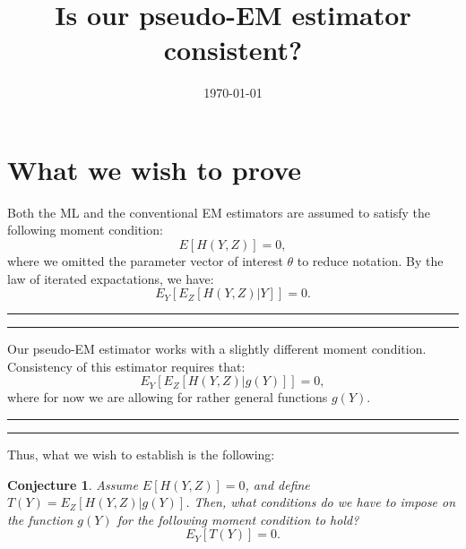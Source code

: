 \documentclass[12pt, a4paper]{article}
\title{Is our pseudo-EM estimator consistent?}
\date{\today}
\newtheorem{conjecture}[theorem]{Conjecture}
\begin{document}
\maketitle


\section{What we wish to prove}
Both the ML and the conventional EM estimators are assumed to satisfy the following moment condition:
\begin{equation}
E[H(Y,Z)]=0,
\end{equation}
where we omitted the parameter vector of interest $\theta$ to reduce notation. By the law of iterated expactations, we have:
\begin{equation}
E_Y\left[E_Z[H(Y,Z)|Y]\right]=0.
\end{equation}
\vspace*{\baselineskip}

\hrule
{}
\hrule\vspace*{\baselineskip}

Our pseudo-EM estimator works with a slightly different moment condition. Consistency of this estimator requires that:
\begin{equation}
E_Y\left[E_Z[H(Y,Z)|g(Y)]\right]=0,
\end{equation}
where for now we are allowing for rather general functions $g(Y)$. 

\vspace*{\baselineskip}
\hrule{}
\hrule\vspace*{\baselineskip}

Thus, what we wish to establish is the following:
\begin{conjecture}
Assume $E[H(Y,Z)]=0$, and define $T(Y)=E_Z[H(Y,Z)|g(Y)]$. Then, what conditions do we have to impose on the function $g(Y)$ for the following moment condition to hold?
\begin{equation}
E_Y\left[T(Y)\right]=0.
\label{eq:ET}
\end{equation}
\end{conjecture}
\end{document}

